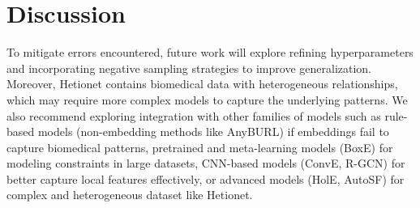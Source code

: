 \section*{Discussion}



To mitigate errors encountered, future work will explore refining hyperparameters and incorporating negative sampling strategies to improve generalization. Moreover, Hetionet contains biomedical data with heterogeneous relationships, which may require more complex models to capture the underlying patterns. We also recommend exploring integration with other families of models such as rule-based models (non-embedding methods like AnyBURL) if embeddings fail to capture biomedical patterns, pretrained and meta-learning models (BoxE) for modeling constraints in large datasets, CNN-based models (ConvE, R-GCN) for better capture local features effectively, or advanced models (HolE, AutoSF) for complex and heterogeneous dataset like Hetionet.
